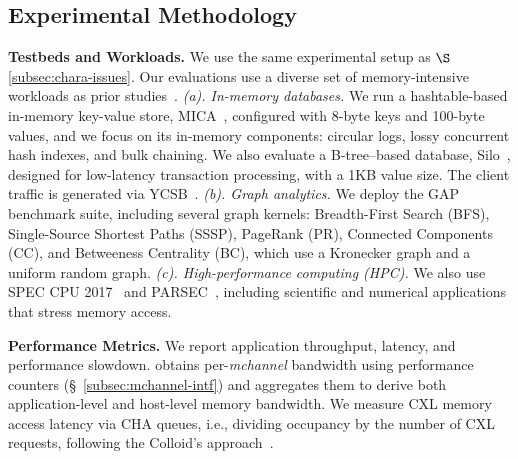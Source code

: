 \subsection{Experimental Methodology}
\label{subsec:eval-exp-methodology}

{\bf Testbeds and Workloads.} We use the same experimental setup as $\S$\ref{subsec:chara-issues}. Our evaluations use a diverse set of memory-intensive workloads as prior studies~\cite{nomad-osdi24,memstrata-osdi24,soar-osdi25,colloid-sosp24}.
%
{\it (a). In-memory databases.} We run a hashtable-based in-memory key-value store, MICA~\cite{mica-nsdi14}, configured with 8-byte keys and 100-byte values, and we focus on its in-memory components: circular logs, lossy concurrent hash indexes, and bulk chaining. We also evaluate a B-tree–based database, Silo~\cite{silo-sosp13}, designed for low-latency transaction processing, with a 1KB value size. The client traffic is generated via YCSB~\cite{ycsb-socc}.
{\it (b). Graph analytics.} We deploy the GAP~\cite{gap-arxiv} benchmark suite, including several graph kernels: Breadth-First Search (BFS), Single-Source Shortest Paths (SSSP), PageRank (PR), Connected Components (CC), and Betweeness Centrality (BC), which use a Kronecker graph and a uniform random graph.
%
{\it (c). High-performance computing (HPC).} We also use SPEC CPU 2017~\cite{spec-cpu} and PARSEC~\cite{bienia2008parsec}, including scientific and numerical applications that stress memory access.

\noindent
{\bf Performance Metrics.} We report application throughput, latency, and performance slowdown. 
\sys obtains per-\textit{mchannel} bandwidth using performance counters (\S~\ref{subsec:mchannel-intf}) and aggregates them to derive both application-level and host-level memory bandwidth. We measure CXL memory access latency via CHA queues, i.e., dividing occupancy by the number of CXL requests, following the Colloid's approach~\cite{colloid-sosp24}.

